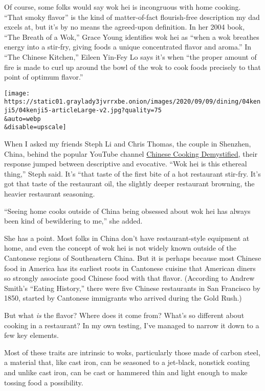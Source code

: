 Of course, some folks would say wok hei is incongruous with home
cooking. ``That smoky flavor'' is the kind of matter-of-fact
flourish-free description my dad excels at, but it's by no means the
agreed-upon definition. In her 2004 book, ``The Breath of a Wok,'' Grace
Young identifies wok hei as ``when a wok breathes energy into a
stir-fry, giving foods a unique concentrated flavor and aroma.'' In
``The Chinese Kitchen,'' Eileen Yin-Fey Lo says it's when ``the proper
amount of fire is made to curl up around the bowl of the wok to cook
foods precisely to that point of optimum flavor.''

\texttt{[image: https://static01.graylady3jvrrxbe.onion/images/2020/09/09/dining/04kenji5/04kenji5-articleLarge-v2.jpg?quality=75\\\&auto=webp\\\&disable=upscale]}

When I asked my friends Steph Li and Chris Thomas, the couple in
Shenzhen, China, behind the popular YouTube channel
\href{https://www.youtube.com/channel/UC54SLBnD5k5U3Q6N__UjbAw}{Chinese
Cooking Demystified}, their response jumped between descriptive and
evocative. ``Wok hei is this ethereal thing,'' Steph said. It's ``that
taste of the first bite of a hot restaurant stir-fry. It's got that
taste of the restaurant oil, the slightly deeper restaurant browning,
the heavier restaurant seasoning.

``Seeing home cooks outside of China being obsessed about wok hei has
always been kind of bewildering to me,'' she added.

She has a point. Most folks in China don't have restaurant-style
equipment at home, and even the concept of wok hei is not widely known
outside of the Cantonese regions of Southeastern China. But it is
perhaps because most Chinese food in America has its earliest roots in
Cantonese cuisine that American diners so strongly associate good
Chinese food with that flavor. (According to Andrew Smith's ``Eating
History,'' there were five Chinese restaurants in San Francisco by 1850,
started by Cantonese immigrants who arrived during the Gold Rush.)

But what \emph{is} the flavor? Where does it come from? What's so
different about cooking in a restaurant? In my own testing, I've managed
to narrow it down to a few key elements.

Most of these traits are intrinsic to woks, particularly those made of
carbon steel, a material that, like cast iron, can be seasoned to a
jet-black, nonstick coating and unlike cast iron, can be cast or
hammered thin and light enough to make tossing food a possibility.

